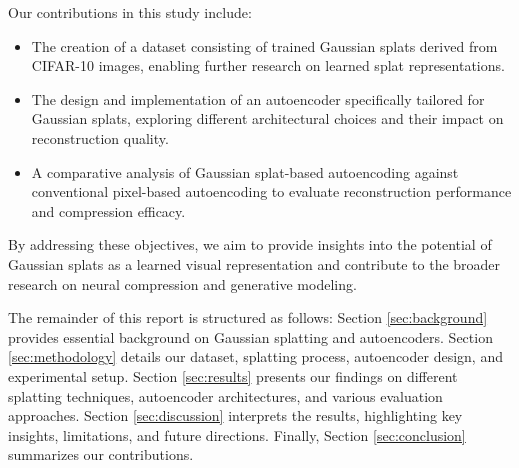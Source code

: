 Our contributions in this study include:
\begin{itemize}
    \item The creation of a dataset consisting of trained Gaussian splats derived from CIFAR-10 images, enabling further research on learned splat representations.
    \item The design and implementation of an autoencoder specifically tailored for Gaussian splats, exploring different architectural choices and their impact on reconstruction quality.
    \item A comparative analysis of Gaussian splat-based autoencoding against conventional pixel-based autoencoding to evaluate reconstruction performance and compression efficacy.
\end{itemize}

By addressing these objectives, we aim to provide insights into the potential of Gaussian splats as a learned visual representation and contribute to the broader research on neural compression and generative modeling.

The remainder of this report is structured as follows: Section \ref{sec:background} provides essential background on Gaussian splatting and autoencoders. Section \ref{sec:methodology} details our dataset, splatting process, autoencoder design, and experimental setup. Section \ref{sec:results} presents our findings on different splatting techniques, autoencoder architectures, and various evaluation approaches. Section \ref{sec:discussion} interprets the results, highlighting key insights, limitations, and future directions. Finally, Section \ref{sec:conclusion} summarizes our contributions.  

